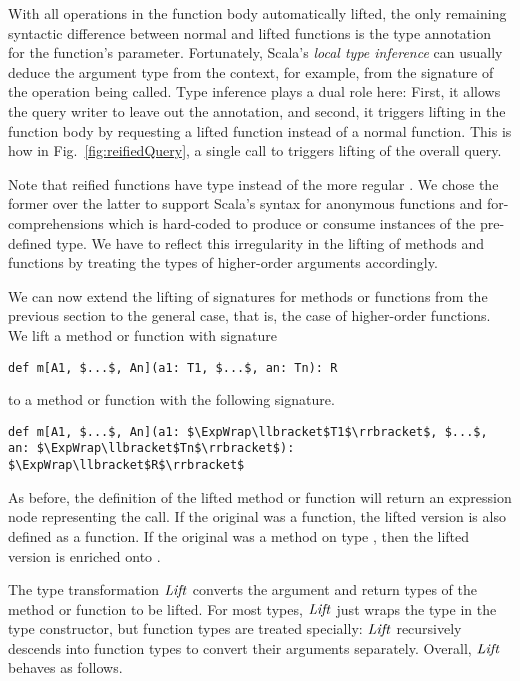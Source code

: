 With all operations in the function body automatically lifted, the only remaining syntactic difference between normal and lifted functions is the type annotation for the function's parameter. Fortunately, Scala's \emph{local type inference} can usually deduce the argument type from the context, for example, from the signature of the  operation being called. Type inference plays a dual role here: First, it allows the query writer to leave out the annotation, and second, it triggers lifting in the function body by requesting a lifted function instead of a normal function. This is how in Fig.~\ref{fig:reifiedQuery}, a single call to  triggers lifting of the overall query.

Note that reified functions have type  instead of the more regular . We chose the former over the latter to support Scala's syntax for anonymous functions and for-comprehensions which is hard-coded to produce or consume instances of the pre-defined  type. We have to reflect this irregularity in the lifting of methods and functions by treating the types of higher-order arguments accordingly.

We can now extend the lifting of signatures for methods or functions from the previous section to the general case, that is, the case of higher-order functions. We lift a method or function with signature
\begin{lstlisting}
def m[A1, $...$, An](a1: T1, $...$, an: Tn): R
\end{lstlisting}
to a method or function with the following signature.
\begin{lstlisting}
def m[A1, $...$, An](a1: $\ExpWrap\llbracket$T1$\rrbracket$, $...$, an: $\ExpWrap\llbracket$Tn$\rrbracket$): $\ExpWrap\llbracket$R$\rrbracket$
\end{lstlisting}
As before, the definition of the lifted method or function will return an expression node representing the call. If the original was a function, the lifted version is also defined as a function. If the original was a method on type , then the lifted version is enriched onto .

The type transformation $\mathit{Lift}$ converts the argument and return types of the method or function to be lifted. For most types, $\mathit{Lift}$ just wraps the type in the  type constructor, but function types are treated specially: $\mathit{Lift}$ recursively descends into function types to convert their arguments separately. Overall, $\mathit{Lift}$ behaves as follows.

